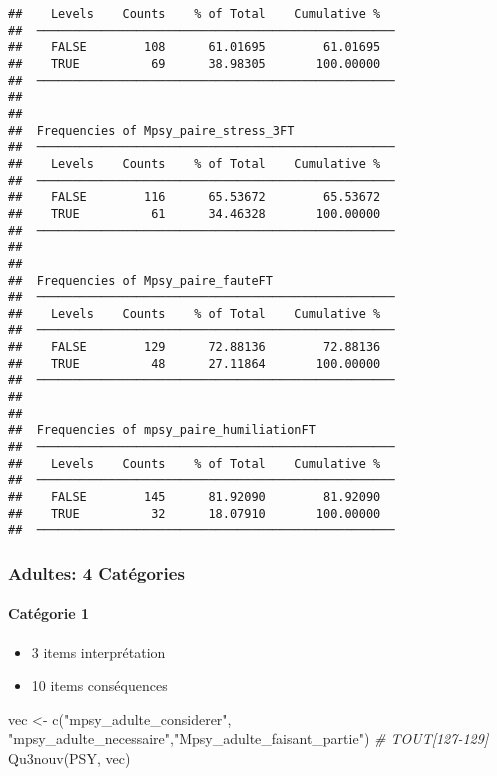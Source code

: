 \documentclass[
]{article}
\newenvironment{Shaded}{\begin{snugshade}}{\end{snugshade}}
\newcommand{\CommentTok}[1]{\textcolor[rgb]{0.56,0.35,0.01}{\textit{#1}}}
\newcommand{\FunctionTok}[1]{\textcolor[rgb]{0.00,0.00,0.00}{#1}}
\newcommand{\NormalTok}[1]{#1}
\newcommand{\OtherTok}[1]{\textcolor[rgb]{0.56,0.35,0.01}{#1}}
\newcommand{\StringTok}[1]{\textcolor[rgb]{0.31,0.60,0.02}{#1}}
\providecommand{\tightlist}{%
  \setlength{\itemsep}{0pt}\setlength{\parskip}{0pt}}
\begin{document}
\begin{verbatim}
##    Levels    Counts    % of Total    Cumulative %   
##  ────────────────────────────────────────────────── 
##    FALSE        108      61.01695        61.01695   
##    TRUE          69      38.98305       100.00000   
##  ────────────────────────────────────────────────── 
## 
## 
##  Frequencies of Mpsy_paire_stress_3FT               
##  ────────────────────────────────────────────────── 
##    Levels    Counts    % of Total    Cumulative %   
##  ────────────────────────────────────────────────── 
##    FALSE        116      65.53672        65.53672   
##    TRUE          61      34.46328       100.00000   
##  ────────────────────────────────────────────────── 
## 
## 
##  Frequencies of Mpsy_paire_fauteFT                  
##  ────────────────────────────────────────────────── 
##    Levels    Counts    % of Total    Cumulative %   
##  ────────────────────────────────────────────────── 
##    FALSE        129      72.88136        72.88136   
##    TRUE          48      27.11864       100.00000   
##  ────────────────────────────────────────────────── 
## 
## 
##  Frequencies of mpsy_paire_humiliationFT            
##  ────────────────────────────────────────────────── 
##    Levels    Counts    % of Total    Cumulative %   
##  ────────────────────────────────────────────────── 
##    FALSE        145      81.92090        81.92090   
##    TRUE          32      18.07910       100.00000   
##  ──────────────────────────────────────────────────
\end{verbatim}

\hypertarget{adultes-4-catuxe9gories}{%
\subsubsection{Adultes: 4 Catégories}\label{adultes-4-catuxe9gories}}

\hypertarget{catuxe9gorie-1-1}{%
\paragraph{Catégorie 1}\label{catuxe9gorie-1-1}}

\begin{itemize}
\tightlist
\item
  3 items interprétation
\item
  10 items conséquences
\end{itemize}

\begin{Shaded}
\begin{Highlighting}[]
\NormalTok{vec }\OtherTok{\textless{}{-}} \FunctionTok{c}\NormalTok{(}\StringTok{"mpsy\_adulte\_considerer"}\NormalTok{,}
         \StringTok{"mpsy\_adulte\_necessaire"}\NormalTok{,}\StringTok{"Mpsy\_adulte\_faisant\_partie"}\NormalTok{)  }\CommentTok{\# TOUT[127{-}129]}
\FunctionTok{Qu3nouv}\NormalTok{(PSY, vec)}
\end{Highlighting}
\end{Shaded}
\end{document}
